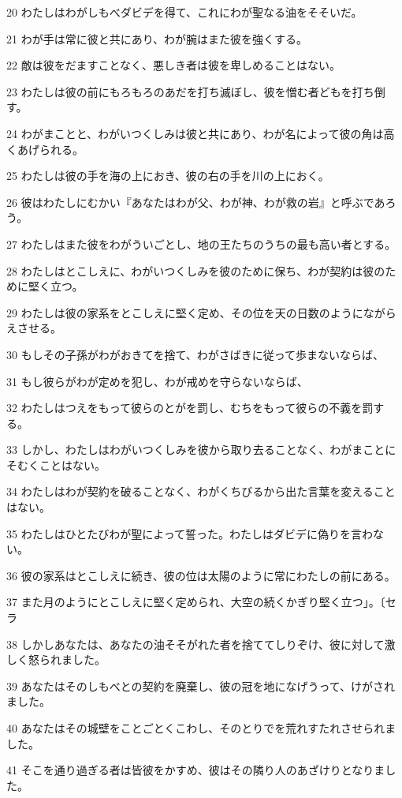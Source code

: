 \par 20 わたしはわがしもべダビデを得て、これにわが聖なる油をそそいだ。
\par 21 わが手は常に彼と共にあり、わが腕はまた彼を強くする。
\par 22 敵は彼をだますことなく、悪しき者は彼を卑しめることはない。
\par 23 わたしは彼の前にもろもろのあだを打ち滅ぼし、彼を憎む者どもを打ち倒す。
\par 24 わがまことと、わがいつくしみは彼と共にあり、わが名によって彼の角は高くあげられる。
\par 25 わたしは彼の手を海の上におき、彼の右の手を川の上におく。
\par 26 彼はわたしにむかい『あなたはわが父、わが神、わが救の岩』と呼ぶであろう。
\par 27 わたしはまた彼をわがういごとし、地の王たちのうちの最も高い者とする。
\par 28 わたしはとこしえに、わがいつくしみを彼のために保ち、わが契約は彼のために堅く立つ。
\par 29 わたしは彼の家系をとこしえに堅く定め、その位を天の日数のようにながらえさせる。
\par 30 もしその子孫がわがおきてを捨て、わがさばきに従って歩まないならば、
\par 31 もし彼らがわが定めを犯し、わが戒めを守らないならば、
\par 32 わたしはつえをもって彼らのとがを罰し、むちをもって彼らの不義を罰する。
\par 33 しかし、わたしはわがいつくしみを彼から取り去ることなく、わがまことにそむくことはない。
\par 34 わたしはわが契約を破ることなく、わがくちびるから出た言葉を変えることはない。
\par 35 わたしはひとたびわが聖によって誓った。わたしはダビデに偽りを言わない。
\par 36 彼の家系はとこしえに続き、彼の位は太陽のように常にわたしの前にある。
\par 37 また月のようにとこしえに堅く定められ、大空の続くかぎり堅く立つ」。〔セラ
\par 38 しかしあなたは、あなたの油そそがれた者を捨ててしりぞけ、彼に対して激しく怒られました。
\par 39 あなたはそのしもべとの契約を廃棄し、彼の冠を地になげうって、けがされました。
\par 40 あなたはその城壁をことごとくこわし、そのとりでを荒れすたれさせられました。
\par 41 そこを通り過ぎる者は皆彼をかすめ、彼はその隣り人のあざけりとなりました。
